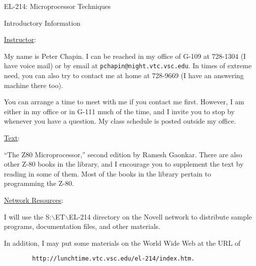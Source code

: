 %
%
%
%

\setlength{\parindent}{0em}
\setlength{\parskip}{1.75ex plus0.5ex minus0.5ex}



\centerline{\Large{EL-214: Microprocessor Techniques}}
\centerline{\Large{Introductory Information}}
\vspace{0.5in}

\underline{Instructor}:

My name is Peter Chapin. I can be reached in my office of G-109 at 728-1304
(I have voice mail) or by email at {\tt pchapin@night.vtc.vsc.edu}. In
times of extreme need, you can also try to contact me at home at 728-9669
(I have an answering machine there too).

You can arrange a time to meet with me if you contact me first. However, I
am either in my office or in G-111 much of the time, and I invite you to
stop by whenever you have a question. My class schedule is posted outside
my office.

\underline{Text}:

``The Z80 Microprocessor,'' second edition by Ramesh Gaonkar. There are
also other Z-80 books in the library, and I encourage you to supplement the
text by reading in some of them. Most of the books in the library pertain
to programming the Z-80.

\underline{Network Resources}:

I will use the S:$\backslash$ET$\backslash$EL-214 directory on the Novell
network to distribute sample programs, documentation files, and other
materials.

In addition, I may put some materials on the World Wide Web at the URL of

\begin{verbatim}
        http://lunchtime.vtc.vsc.edu/el-214/index.htm.
\end{verbatim}

